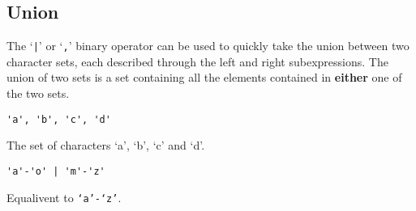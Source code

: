 
\subsection{Union}
{
	The `\texttt{|}' or `\texttt{,}' binary operator can be used to
	quickly take the union between two character sets, each described through
	the left and right subexpressions. The union of two sets is
	a set containing all the elements contained in \textbf{either} one of the
	two sets.
	
	\begin{itemize}
	{
		\item[] \lstinline[language=MAIA, columns=fixed]@'a', 'b', 'c', 'd'@
		
			The set of characters `a', `b', `c' and `d'.
		
		\item[] \lstinline[language=MAIA, columns=fixed]@'a'-'o' | 'm'-'z'@
		
			Equalivent to \texttt{`a'-`z'}.
	}
	\end{itemize}
}
